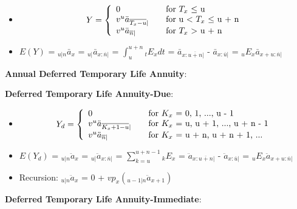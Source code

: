 \documentclass[]{book}
\begin{document}
\begin{itemize}
\item
  \[Y = \left\{
    \begin{array}{l l l}
      0                      & \quad \text{for $T_x$ $\le$ u}\\
      v^u \bar{a}_{\overline{T_x - u}|}                 & \quad \text{for u $<$ $T_x$ $\le$ u + n}\\
      v^u \bar{a}_{\overline{n}|}                       & \quad \text{for $T_x$ $>$ u + n}\\
    \end{array} \right.\]
\item
  \(E(Y)\) = \({}_{u|n}\bar{a}_x\) =
  \({}_{u|}\bar{a}_{x:\overline{n}|}\) = \(\int^{u + n}_u {}_{t}E_x dt\)
  = \(\bar{a}_{x:\overline{u +n}|}\) - \(\bar{a}_{x:\overline{u}|}\) =
  \({}_{u}E_x\)\(\bar{a}_{x + u:\overline{n}|}\)
\end{itemize}

\textbf{Annual Deferred Temporary Life Annuity}:

\textbf{Deferred Temporary Life Annuity-Due}:

\begin{itemize}
\item
  \[Y_d = \left\{
    \begin{array}{l l l}
      0                      & \quad \text{for $K_x$ = 0, 1, ..., u - 1}\\
      v^u \ddot{a}_{\overline{K_x + 1 - u}|}                 & \quad \text{for $K_x$ = u, u + 1, ..., u + n - 1}\\
      v^u \ddot{a}_{\overline{n}|}                       & \quad \text{for $K_x$ = u + n, u + n + 1, ...}\\
    \end{array} \right.\]
\item
  \(E(Y_d)\) = \({}_{u|n}\ddot{a}_x\) =
  \({}_{u|}\ddot{a}_{x:\overline{n}|}\) =
  \(\sum^{u + n - 1}_{k = u} {}_{k}E_x\) =
  \(\ddot{a}_{x:\overline{u +n}|}\) - \(\ddot{a}_{x:\overline{u}|}\) =
  \({}_{u}E_x\)\(\ddot{a}_{x + u:\overline{n}|}\)
\item
  Recursion: \({}_{u|n}\ddot{a}_x\) = 0 +
  \(vp_x({}_{u - 1|n}\ddot{a}_{x + 1})\)
\end{itemize}

\textbf{Deferred Temporary Life Annuity-Immediate}:
\end{document}

